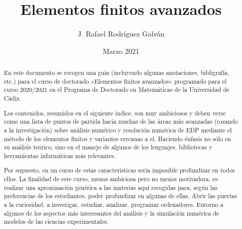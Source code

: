\documentclass[11pt]{article}
\title{Elementos finitos avanzados}
\author{J. Rafael Rodríguez Galván}
\date{Marzo 2021}
\begin{document}
\maketitle
\tableofcontents

\begin{abstract}
En este documento se recogen una guía (incluyendo algunas anotaciones,
bibligrafía, etc.) para el curso de doctorado «Elementos finitos
avanzados» programado para el curso 2020/2021 en el Programa de
Doctorado en Matemáticas de la Universidad de Cádiz.

Los contenidos, resumidos en el siguiente índice, son muy ambiciosos y
deben verse como una lista de puntos de partida hacia muchas de las
áreas más avanzadas (rozando a la investigación) sobre análisis
numérico y resolución numérica de EDP mediante el método de los
elementos finitos y variantes cercanas a el. Haciendo énfasis no sólo
en su análisis teórico, sino en el manejo de algunos de los lenguajes,
bibliotecas y herramientas informáticas más relevantes.

Por supuesto, en un curso de estas características sería imposible
profundizar en todos ellos. La finalidad de este curso, menos
ambiciosa pero no menos motivadora, es realizar una aproximación
genérica a las materias aquí recogidas para, según las preferencias de
los estudiantes, poder profundizar en algunas de ellas.  Abrir las
puertas a la curiosidad, a investigar, estudiar, analizar, programar
ordenadores. Entorno a algunos de los aspectos más interesantes del
análisis y la simulación numérica de modelos de las ciencias experimentales.
\end{abstract}












\end{document}

